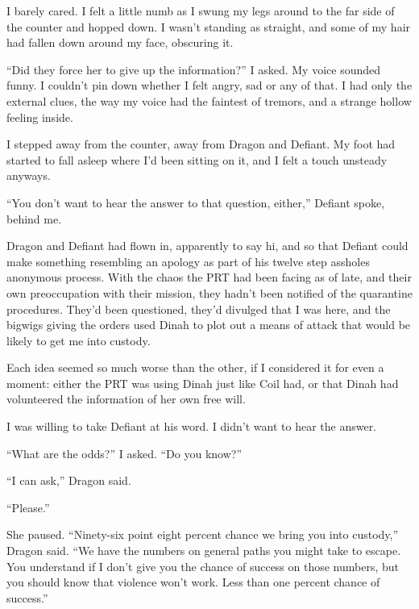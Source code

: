 I barely cared.  I felt a little numb as I swung my legs around to the far side of the counter and hopped down.  I wasn't standing as straight, and some of my hair had fallen down around my face, obscuring it.



``Did they force her to give up the information?'' I asked.  My voice sounded funny.  I couldn't pin down whether I felt angry, sad or any of that.  I had only the external clues, the way my voice had the faintest of tremors, and a strange hollow feeling inside.



I stepped away from the counter, away from Dragon and Defiant.  My foot had started to fall asleep where I'd been sitting on it, and I felt a touch unsteady anyways.



``You don't want to hear the answer to that question, either,'' Defiant spoke, behind me.



Dragon and Defiant had flown in, apparently to say hi, and so that Defiant could make something resembling an apology as part of his twelve step assholes anonymous process.  With the chaos the PRT had been facing as of late, and their own preoccupation with their mission, they hadn't been notified of the quarantine procedures.  They'd been questioned, they'd divulged that I was here, and the bigwigs giving the orders used Dinah to plot out a means of attack that would be likely to get me into custody.



Each idea seemed so much worse than the other, if I considered it for even a moment: either the PRT was using Dinah just like Coil had, or that Dinah had volunteered the information of her own free will.



I was willing to take Defiant at his word.  I didn't want to hear the answer.



``What are the odds?'' I asked.  ``Do you know?''



``I can ask,'' Dragon said.



``Please.''



She paused.  ``Ninety-six point eight percent chance we bring you into custody,'' Dragon said.  ``We have the numbers on general paths you might take to escape.  You understand if I don't give you the chance of success on those numbers, but you should know that violence won't work.  Less than one percent chance of success.''



